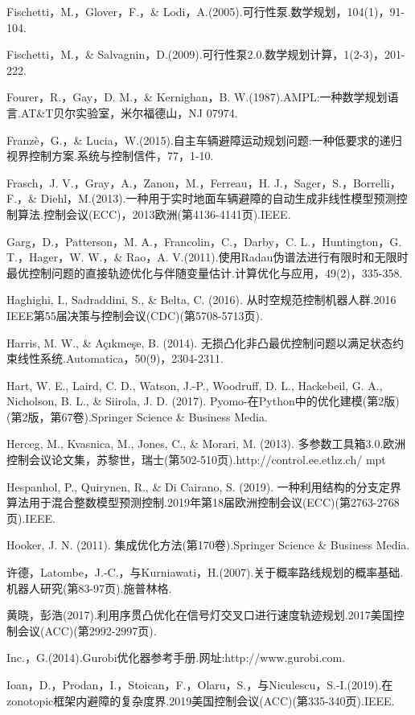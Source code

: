 \documentclass[10pt]{article}
\begin{document}
Fischetti，M.，Glover，F.，\& Lodi，A.(2005).可行性泵.数学规划，104(1)，91-104.

Fischetti，M.，\& Salvagnin，D.(2009).可行性泵2.0.数学规划计算，1(2-3)，201-222.

Fourer，R.，Gay，D. M.，\& Kernighan，B. W.(1987).AMPL:一种数学规划语言.AT\&T贝尔实验室，米尔福德山，NJ 07974.

Franzè，G.，\& Lucia，W.(2015).自主车辆避障运动规划问题:一种低要求的递归视界控制方案.系统与控制信件，77，1-10.

Frasch，J. V.，Gray，A.，Zanon，M.，Ferreau，H. J.，Sager，S.，Borrelli，F.，\& Diehl，M.(2013).一种用于实时地面车辆避障的自动生成非线性模型预测控制算法.控制会议(ECC)，2013欧洲(第4136-4141页).IEEE.

Garg，D.，Patterson，M. A.，Francolin，C.，Darby，C. L.，Huntington，G. T.，Hager，W. W.，\& Rao，A. V.(2011).使用Radau伪谱法进行有限时和无限时最优控制问题的直接轨迹优化与伴随变量估计.计算优化与应用，49(2)，335-358.

Haghighi, I., Sadraddini, S., \& Belta, C. (2016). 从时空规范控制机器人群.2016 IEEE第55届决策与控制会议(CDC)(第5708-5713页).

Harris, M. W., \& Açıkmeşe, B. (2014). 无损凸化非凸最优控制问题以满足状态约束线性系统.Automatica，50(9)，2304-2311.

Hart, W. E., Laird, C. D., Watson, J.-P., Woodruff, D. L., Hackebeil, G. A., Nicholson, B. L., \& Siirola, J. D. (2017). Pyomo-在Python中的优化建模(第2版)(第2版，第67卷).Springer Science \& Business Media.

Herceg, M., Kvasnica, M., Jones, C., \& Morari, M. (2013). 多参数工具箱3.0.欧洲控制会议论文集，苏黎世，瑞士(第502-510页).http://control.ee.ethz.ch/ mpt

Hespanhol, P., Quirynen, R., \& Di Cairano, S. (2019). 一种利用结构的分支定界算法用于混合整数模型预测控制.2019年第18届欧洲控制会议(ECC)(第2763-2768页).IEEE.

Hooker, J. N. (2011). 集成优化方法(第170卷).Springer Science \& Business Media.

许德，Latombe，J.-C.，与Kurniawati，H.(2007).关于概率路线规划的概率基础.机器人研究(第83-97页).施普林格.

黄晓，彭浩(2017).利用序贯凸优化在信号灯交叉口进行速度轨迹规划.2017美国控制会议(ACC)(第2992-2997页).

Inc.，G.(2014).Gurobi优化器参考手册.网址:http://www.gurobi.com.

Ioan，D.，Prodan，I.，Stoican，F.，Olaru，S.，与Niculescu，S.-I.(2019).在zonotopic框架内避障的复杂度界.2019美国控制会议(ACC)(第335-340页).IEEE.
\end{document}
